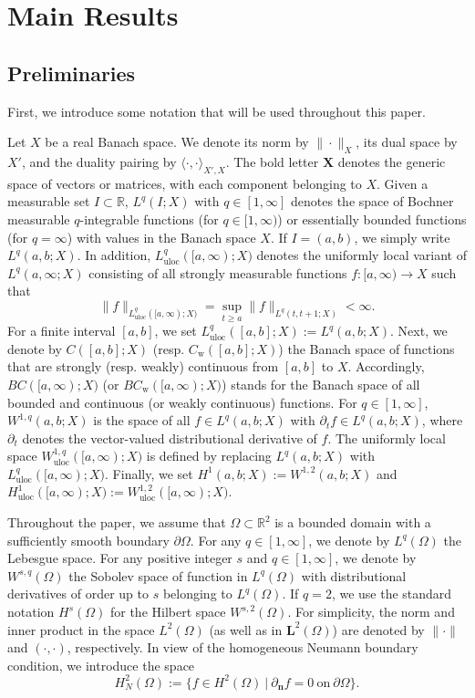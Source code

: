 \documentclass[11pt,reqno]{amsart}
\newcommand{\uloc}{\operatorname{uloc}}
\begin{document}
\section{Main Results}
\setcounter{equation}{0}
\label{pm}
%
\subsection{Preliminaries}
First, we introduce some notation that will be used
throughout this paper.

Let $X$ be a real Banach space. We denote its norm by $\|\cdot\|_X$, its dual space by $X'$, and the duality pairing by $\langle \cdot,\cdot\rangle_{X',X}$. The bold letter $\bm{X}$ denotes the generic space of vectors or matrices, with each component belonging to $X$. Given a measurable set $I\subset \mathbb{R}$, $L^q(I;X)$ with $q\in [1,\infty]$ denotes the space of Bochner measurable $q$-integrable functions (for $q\in [1,\infty)$) or essentially bounded functions (for $q=\infty$) with values in the Banach space $X$. If $I=(a, b)$, we simply write $L^q(a,b;X)$. In addition, $L^q_{\uloc}([a,\infty); X)$ denotes the uniformly local variant of $L^q(a,\infty;X)$ consisting of all strongly measurable functions $f\colon
[a,\infty)\to X$ such that
%
\begin{equation*}
  \|f\|_{L^q_{\uloc}([a,\infty); X)}= \sup_{t\geq a}\|f\|_{L^q(t,t+1;X)} <\infty.
\end{equation*}
%
For a finite interval $[a,b]$, we set $L^q_{\uloc}([a,b]; X) := L^q(a,b;X)$. Next, we denote by $C([a,b];X)$ (resp. $C_{\mathrm{w}}([a,b];X)$) the Banach space of functions that are strongly (resp. weakly) continuous from $[a,b]$ to $X$. Accordingly, $BC([a,\infty);X)$ (or $BC_{\mathrm{w}}([a,\infty);X)$) stands for the Banach space of all bounded and continuous (or weakly continuous) functions. For $q\in [1,\infty]$, $W^{1,q}(a,b;X)$ is the space of all $f\in L^q(a,b;X)$ with $\partial_t f \in L^q(a,b;X)$, where $\partial_t$ denotes the vector-valued distributional derivative of $f$. The uniformly local space $W^{1,q}_{\uloc}([a,\infty);X)$ is defined by replacing $L^q(a,b;X)$ with $L^q_{\uloc}([a,\infty);X)$. Finally, we set $H^1(a,b;X):= W^{1,2}(a,b;X)$ and $H^1_{\uloc}([a,\infty);X) := W^{1,2}_{\uloc}([a,\infty);X)$.

Throughout the paper, we assume that $\Omega \subset\mathbb{R}^2$ is a bounded domain with a sufficiently smooth boundary $\partial\Omega$. For any $q \in [1,\infty]$, we denote by $L^{q}(\Omega)$ the Lebesgue space. For any positive integer $s$ and $q\in [1,\infty]$, we denote by $W^{s,q}(\Omega)$ the Sobolev space of function in $L^q(\Omega)$ with distributional derivatives of order up to $s$ belonging to $L^q(\Omega)$. If $q=2$, we use the standard notation $H^{s}(\Omega)$ for the Hilbert space $W^{s,2}(\Omega )$. For simplicity, the norm and inner product in the space $L^{2}(\Omega)$ (as well as in $\bm{L}^{2}(\Omega)$) are denoted by $\|\cdot\|$ and $(\cdot,\cdot)$, respectively. In view of the homogeneous Neumann boundary condition, we introduce the space
$$
H^2_{N}(\Omega):= \big\{f\in H^2(\Omega)\ |\  \partial_{\bm{n}}f=0 \ \textrm{on}\  \partial \Omega\big\}.
$$
\end{document}
